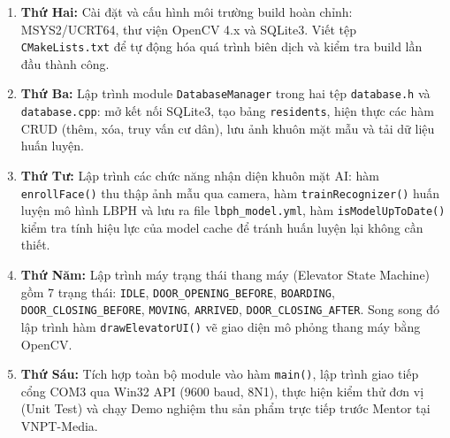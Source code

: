 \documentclass[12pt,a4paper]{article}
\begin{document}
\begin{enumerate}
    \item \textbf{Thứ Hai:} Cài đặt và cấu hình môi trường build hoàn chỉnh: MSYS2/UCRT64, thư viện OpenCV 4.x và SQLite3. Viết tệp \texttt{CMakeLists.txt} để tự động hóa quá trình biên dịch và kiểm tra build lần đầu thành công.

    \item \textbf{Thứ Ba:} Lập trình module \texttt{DatabaseManager} trong hai tệp \texttt{database.h} và \texttt{database.cpp}: mở kết nối SQLite3, tạo bảng \texttt{residents}, hiện thực các hàm CRUD (thêm, xóa, truy vấn cư dân), lưu ảnh khuôn mặt mẫu và tải dữ liệu huấn luyện.

    \item \textbf{Thứ Tư:} Lập trình các chức năng nhận diện khuôn mặt AI: hàm \texttt{enrollFace()} thu thập ảnh mẫu qua camera, hàm \texttt{trainRecognizer()} huấn luyện mô hình LBPH và lưu ra file \texttt{lbph\_model.yml}, hàm \texttt{isModelUpToDate()} kiểm tra tính hiệu lực của model cache để tránh huấn luyện lại không cần thiết.

    \item \textbf{Thứ Năm:} Lập trình máy trạng thái thang máy (Elevator State Machine) gồm 7 trạng thái: \texttt{IDLE}, \texttt{DOOR\_OPENING\_BEFORE}, \texttt{BOARDING}, \texttt{DOOR\_CLOSING\_BEFORE}, \texttt{MOVING}, \texttt{ARRIVED}, \texttt{DOOR\_CLOSING\_AFTER}. Song song đó lập trình hàm \texttt{drawElevatorUI()} vẽ giao diện mô phỏng thang máy bằng OpenCV.

    \item \textbf{Thứ Sáu:} Tích hợp toàn bộ module vào hàm \texttt{main()}, lập trình giao tiếp cổng COM3 qua Win32 API (9600 baud, 8N1), thực hiện kiểm thử đơn vị (Unit Test) và chạy Demo nghiệm thu sản phẩm trực tiếp trước Mentor tại VNPT-Media.
\end{enumerate}
\end{document}
